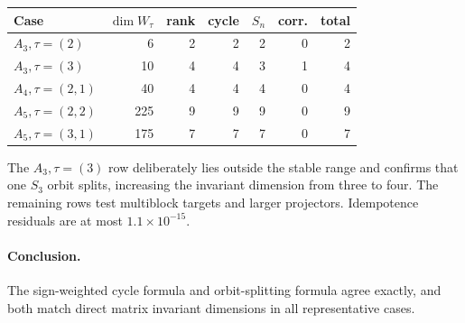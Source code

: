 \documentclass[10pt]{article}
\begin{document}
\begin{center}
\small
\begin{tabular}{@{}lrrrrrr@{}}
\toprule
Case & $\dim W_\tau$ & rank & cycle & $S_n$ & corr. & total\\
\midrule
$A_3,\tau=(2)$ & 6 & 2 & 2 & 2 & 0 & 2\\
$A_3,\tau=(3)$ & 10 & 4 & 4 & 3 & 1 & 4\\
$A_4,\tau=(2,1)$ & 40 & 4 & 4 & 4 & 0 & 4\\
$A_5,\tau=(2,2)$ & 225 & 9 & 9 & 9 & 0 & 9\\
$A_5,\tau=(3,1)$ & 175 & 7 & 7 & 7 & 0 & 7\\
\bottomrule
\end{tabular}
\end{center}
The $A_3,\tau=(3)$ row deliberately lies outside the stable range and confirms
that one $S_3$ orbit splits, increasing the invariant dimension from three to
four.  The remaining rows test multiblock targets and larger projectors.
Idempotence residuals are at most $1.1\times10^{-15}$.

\paragraph{Conclusion.}
The sign-weighted cycle formula and orbit-splitting formula agree exactly, and
both match direct matrix invariant dimensions in all representative cases.
\end{document}
